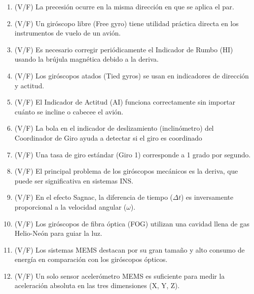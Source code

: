 \begin{enumerate}
\item (V/F) La precesión ocurre en la misma dirección en que se aplica el par.

\item (V/F) Un giróscopo libre (Free gyro) tiene utilidad práctica directa en los instrumentos de vuelo de un avión.

\item (V/F) Es necesario corregir periódicamente el Indicador de Rumbo (HI) usando la brújula magnética debido a la deriva.

\item (V/F) Los giróscopos atados (Tied gyros) se usan en indicadores de dirección y actitud.

\item (V/F) El Indicador de Actitud (AI) funciona correctamente sin importar cuánto se incline o cabecee el avión.

\item (V/F) La bola en el indicador de deslizamiento (inclinómetro) del Coordinador de Giro ayuda a detectar si el giro es coordinado

\item (V/F) Una tasa de giro estándar (Giro 1) corresponde a 1 grado por segundo.

\item (V/F) El principal problema de los giróscopos mecánicos es la deriva, que puede ser significativa en sistemas INS.

\item (V/F) En el efecto Sagnac, la diferencia de tiempo (\(\Delta t\)) es inversamente proporcional a la velocidad angular (\(\omega\)).

\item (V/F) Los giróscopos de fibra óptica (FOG) utilizan una cavidad llena de gas Helio-Neón para guiar la luz.

\item (V/F) Los sistemas MEMS destacan por su gran tamaño y alto consumo de energía en comparación con los giróscopos ópticos.

\item (V/F) Un solo sensor acelerómetro MEMS es suficiente para medir la aceleración absoluta en las tres dimensiones (X, Y, Z).\\
\end{enumerate}


	
	
	
	
	